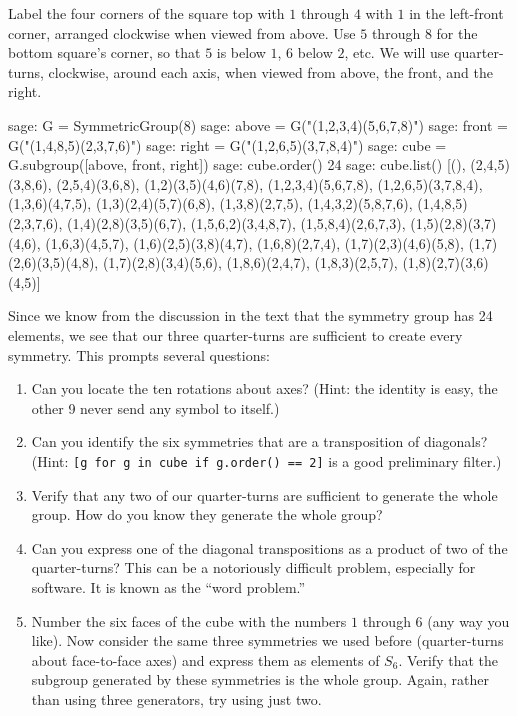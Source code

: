 %
Label the four corners of the square top with $1$ through $4$ with $1$ in the left-front corner, arranged clockwise when viewed from above.  Use $5$ through $8$ for the bottom square's corner, so that $5$ is below $1$, $6$ below $2$, etc.  We will use quarter-turns, clockwise, around each axis, when viewed from above, the front, and the right.
%
\begin{sageexample}
sage: G = SymmetricGroup(8)
sage: above = G("(1,2,3,4)(5,6,7,8)")
sage: front = G("(1,4,8,5)(2,3,7,6)")
sage: right = G("(1,2,6,5)(3,7,8,4)")
sage: cube = G.subgroup([above, front, right])
sage: cube.order()
24
sage: cube.list()
[(), (2,4,5)(3,8,6), (2,5,4)(3,6,8), (1,2)(3,5)(4,6)(7,8),
(1,2,3,4)(5,6,7,8), (1,2,6,5)(3,7,8,4), (1,3,6)(4,7,5),
(1,3)(2,4)(5,7)(6,8), (1,3,8)(2,7,5), (1,4,3,2)(5,8,7,6),
(1,4,8,5)(2,3,7,6), (1,4)(2,8)(3,5)(6,7), (1,5,6,2)(3,4,8,7),
(1,5,8,4)(2,6,7,3), (1,5)(2,8)(3,7)(4,6), (1,6,3)(4,5,7),
(1,6)(2,5)(3,8)(4,7), (1,6,8)(2,7,4), (1,7)(2,3)(4,6)(5,8),
(1,7)(2,6)(3,5)(4,8), (1,7)(2,8)(3,4)(5,6), (1,8,6)(2,4,7),
(1,8,3)(2,5,7), (1,8)(2,7)(3,6)(4,5)]
\end{sageexample}
%
Since we know from the discussion in the text that the symmetry group has 24 elements, we see that our three quarter-turns are sufficient to create every symmetry.  This prompts several questions:
%
\begin{enumerate}
%
\item  Can you locate the ten rotations about axes?  (Hint: the identity is easy, the other 9 never send any symbol to itself.)
%
\item Can you identify the six symmetries that are a transposition of diagonals?  (Hint: \verb?[g for g in cube if g.order() == 2]? is a good preliminary filter.)
%
\item Verify that any two of our quarter-turns are sufficient to generate the whole group.  How do you know they generate the whole group?
%
\item Can you express one of the diagonal transpositions as a product of two of the quarter-turns?  This can be a notoriously difficult problem, especially for software.  It is known as the ``word problem.''
%
\item Number the six faces of the cube with the numbers $1$ through $6$ (any way you like).  Now consider the same three symmetries we used before (quarter-turns about face-to-face axes) and express them as elements of $S_6$.  Verify that the subgroup generated by these symmetries is the whole group.  Again, rather than using three generators, try using just two.
%
\end{enumerate}
%
\begin{sageverbatim}
\end{sageverbatim}
%

